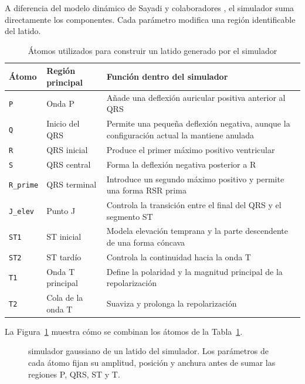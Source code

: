 A diferencia del modelo dinámico de Sayadi y colaboradores \cite{sayadi2010}, el simulador suma directamente los componentes. Cada parámetro modifica una región identificable del latido.

\begin{table}[H]
\centering
\small
\begin{tabularx}{\textwidth}{p{2.2cm} p{3.8cm} X}
\toprule
\textbf{Átomo} & \textbf{Región principal} & \textbf{Función dentro del simulador} \\
\midrule
\texttt{P} & Onda P & Añade una deflexión auricular positiva anterior al QRS \\
\texttt{Q} & Inicio del QRS & Permite una pequeña deflexión negativa, aunque la configuración actual la mantiene anulada \\
\texttt{R} & QRS inicial & Produce el primer máximo positivo ventricular \\
\texttt{S} & QRS central & Forma la deflexión negativa posterior a R \\
\texttt{R\_prime} & QRS terminal & Introduce un segundo máximo positivo y permite una forma RSR prima \\
\texttt{J\_elev} & Punto J & Controla la transición entre el final del QRS y el segmento ST \\
\texttt{ST1} & ST inicial & Modela elevación temprana y la parte descendente de una forma cóncava \\
\texttt{ST2} & ST tardío & Controla la continuidad hacia la onda T \\
\texttt{T1} & Onda T principal & Define la polaridad y la magnitud principal de la repolarización \\
\texttt{T2} & Cola de la onda T & Suaviza y prolonga la repolarización \\
\bottomrule
\end{tabularx}
\caption{Átomos utilizados para construir un latido generado por el simulador}
\label{tab:atomos}
\end{table}

La Figura~\ref{fig:gaussian_generator} muestra cómo se combinan los átomos de la Tabla~\ref{tab:atomos}.

\begin{figure}[H]
  \centering
  \caption{simulador gaussiano de un latido del simulador. Los parámetros de cada átomo fijan su amplitud, posición y anchura antes de sumar las regiones P, QRS, ST y T.}
  \label{fig:gaussian_generator}
\end{figure}

